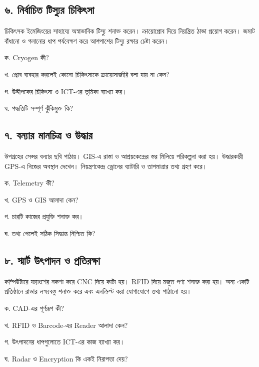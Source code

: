 \subsection{৬. নির্বাচিত টিস্যুর চিকিৎসা}
চিকিৎসক ইমেজিংয়ের সাহায্যে অস্বাভাবিক টিস্যু শনাক্ত করেন। ক্রায়োপ্রোব দিয়ে নিয়ন্ত্রিত ঠান্ডা প্রয়োগ করেন। জমাট বাঁধানো ও গলানোর ধাপ পর্যবেক্ষণ করে আশপাশের টিস্যু রক্ষার চেষ্টা করেন।
\begin{compactenum}
\item ক. Cryogen কী?

\item খ. প্রোব ব্যবহার করলেই কোনো চিকিৎসাকে ক্রায়োসার্জারি বলা যায় না কেন?

\item গ. উদ্দীপকের চিকিৎসা ও ICT-এর ভূমিকা ব্যাখ্যা কর।

\item ঘ. পদ্ধতিটি সম্পূর্ণ ঝুঁকিমুক্ত কি?

\end{compactenum}

\subsection{৭. বন্যার মানচিত্র ও উদ্ধার}
উপগ্রহের সেন্সর বন্যার ছবি পাঠায়। GIS-এ রাস্তা ও আশ্রয়কেন্দ্রের স্তর মিলিয়ে পরিকল্পনা করা হয়। উদ্ধারকারী GPS-এ নিজের অবস্থান দেখেন। নিয়ন্ত্রণকেন্দ্র ড্রোনের ব্যাটারি ও তাপমাত্রার তথ্য গ্রহণ করে।
\begin{compactenum}
\item ক. Telemetry কী?

\item খ. GPS ও GIS আলাদা কেন?

\item গ. চারটি কাজের প্রযুক্তি শনাক্ত কর।

\item ঘ. তথ্য পেলেই সঠিক সিদ্ধান্ত নিশ্চিত কি?

\end{compactenum}

\subsection{৮. স্মার্ট উৎপাদন ও প্রতিরক্ষা}
কম্পিউটারে যন্ত্রাংশের নকশা করে CNC দিয়ে কাটা হয়। RFID দিয়ে মজুত পণ্য শনাক্ত করা হয়। অন্য একটি প্রতিষ্ঠানে রাডার লক্ষ্যবস্তু শনাক্ত করে এবং এনক্রিপ্ট করা যোগাযোগে তথ্য পাঠানো হয়।
\begin{compactenum}
\item ক. CAD-এর পূর্ণরূপ কী?

\item খ. RFID ও Barcode-এর Reader আলাদা কেন?

\item গ. উৎপাদনের ধাপগুলোতে ICT-এর কাজ ব্যাখ্যা কর।

\item ঘ. Radar ও Encryption কি একই নিরাপত্তা দেয়?

\end{compactenum}

